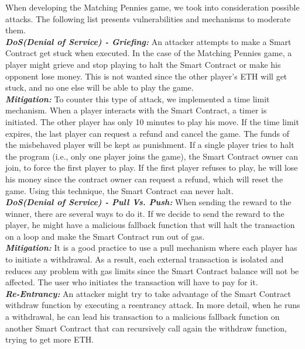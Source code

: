 \documentclass[12pt,a4paper]{article}
\begin{document}
When developing the Matching Pennies game, we took into consideration possible attacks.
The following list presents vulnerabilities and mechanisms to moderate them. \\

\textbf{\emph{DoS(Denial of Service) - Griefing: }}An attacker attempts to make a Smart Contract get stuck
when executed. In the case of the Matching Pennies game, a player might grieve and stop
playing to halt the Smart Contract or make his opponent lose money. This is not wanted
since the other player's ETH will get stuck, and no one else will be able to play the game. \\

\textbf{\emph{Mitigation: }}To counter this type of attack, we implemented a time limit mechanism.
When a player interacts with the Smart Contract, a timer is initiated. The other
player has only 10 minutes to play his move. If the time limit expires, the last
player can request a refund and cancel the game. The funds of the misbehaved player
will be kept as punishment. If a single player tries to halt the program
(i.e., only one player joins the game), the Smart Contract owner can join,
to force the first player to play. If the first player refuses to play, he will
lose his money since the contract owner can request a refund, which will reset the game.
Using this technique, the Smart Contract can never halt. \\

\textbf{\emph{DoS(Denial of Service) - Pull Vs. Push: }}When sending the reward to the winner,
there are several ways to do it. If we decide to send the reward to the player, he
might have a malicious fallback function that will halt the transaction on a loop
and make the Smart Contract run out of gas. \\

\textbf{\emph{Mitigation: }}It is a good practice to use a pull mechanism where each
player has to initiate a withdrawal. As a result, each external transaction is isolated
and reduces any problem with gas limits since the Smart Contract balance will not be affected.
The user who initiates the transaction will have to pay for it. \\

\textbf{\emph{Re-Entrancy: }}An attacker might try to take advantage of the Smart Contract withdraw
function by executing a reentrancy attack. In more detail, when he runs a withdrawal,
he can lead his transaction to a malicious fallback function on another Smart Contract
that can recursively call again the withdraw function, trying to get more ETH. \\
\end{document}
